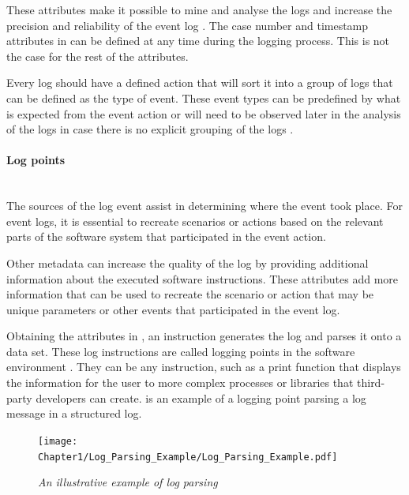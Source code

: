 These attributes make it possible to mine and analyse the logs and increase the precision and reliability of the event log \cite{Kherbouche2017}. The case number and timestamp attributes in  can be defined at any time during the logging process. This is not the case for the rest of the attributes. \par Every log should have a defined action that will sort it into a group of logs that can be defined as the type of event. These event types can be predefined by what is expected from the event action or will need to be observed later in the analysis of the logs in case there is no explicit grouping of the logs \cite{Bekeneva2020, Fedaghi2010}.

\paragraph{Log points}\leavevmode\\
The sources of the log event assist in determining where the event took place. For event logs, it is essential to recreate scenarios or actions based on the relevant parts of the software system that participated in the event action.\par Other metadata can increase the quality of the log by providing additional information about the executed software instructions. These attributes add more information that can be used to recreate the scenario or action that may be unique parameters or other events that participated in the event log.\par Obtaining the attributes in , an instruction generates the log and parses it onto a data set. These log instructions are called logging points in the software environment \cite{Pecchia2015, Zhu2015}. They can be any instruction, such as a print function that displays the information for the user to more complex processes or libraries that third-party developers can create.  is an example of a logging point parsing a log message in a structured log. 

\clearpage

\begin{figure}[!htb]
	\centering %
	\texttt{[image: Chapter1/Log\_Parsing\_Example/Log\_Parsing\_Example.pdf]}
	\caption[An illustrative example of log parsing]
	{\textit{An illustrative example of log parsing \cite{Zhu2019}}} \label{fig:ch1_logParsing}
\end{figure}

